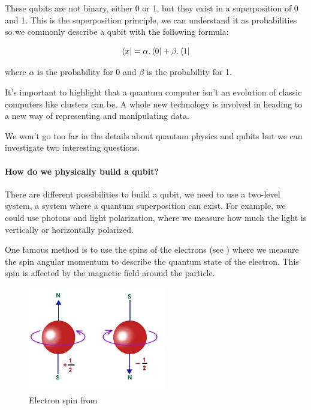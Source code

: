 These qubits are not binary, either 0 or 1, but they exist in a superposition of 0 and 1. This is the superposition principle, we can understand it as probabilities so we commonly describe a qubit with the following formula: \newline

\begin{equation}
  \bra{x} = \alpha . \bra{0} + \beta . \bra{1}
\end{equation}
\medskip

where $\alpha$ is the probability for 0 and $\beta$ is the probability for 1. \newline

It's important to highlight that a quantum computer isn't an evolution of classic computers like clusters can be. A whole new technology is involved in heading to a new way of representing and manipulating data. \newline

We won't go too far in the details about quantum physics and qubits but we can investigate two interesting questions. \newline

\paragraph{How do we physically build a qubit?}

There are different possibilities to build a qubit, we need to use a two-level system, a system where a quantum superposition can exist. For example, we could use photons and light polarization, where we measure how much the light is vertically or horizontally polarized. \newline

One famous method is to use the spins of the electrons (see \cite{spinWiki}) where we measure the spin angular momentum to describe the quantum state of the electron. This spin is affected by the magnetic field around the particle. \newline

\begin{figure}[ht]
\centering
\includegraphics[width=6cm]{Figures/electronSpin}
\caption{Electron spin from \cite{spinNumber}}
\end{figure}
\medskip

